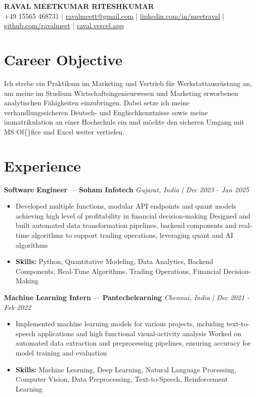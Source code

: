 \documentclass[a4paper,10pt]{article}
\begin{document}
\begin{center}
  {\Large\bfseries RAVAL MEETKUMAR RITESHKUMAR}\\[2pt]
  {\small +49 15565 468731 \;|\; \href{mailto:ravalmeett@gmail.com}{ravalmeett@gmail.com} \;|\; \href{https://www.linkedin.com/in/meetraval/}{linkedin.com/in/meetraval} \;|\; \href{https://github.com/ravalmeet}{github.com/ravalmeet} \;|\; \href{https://raval.vercel.app/}{raval.vercel.app}}
\end{center}
\vspace{-3pt}

\section*{Career Objective}
Ich strebe ein Praktikum im Marketing und Vertrieb für Werkstattausrüstung an, um meine im Studium Wirtschaftsingenieurwesen und Marketing erworbenen analytischen Fähigkeiten einzubringen. Dabei setze ich meine verhandlungssicheren Deutsch- und Englischkenntnisse sowie meine immatrikulation an einer Hochschule ein und möchte den sicheren Umgang mit MS Of\{\}fice und Excel weiter vertiefen.\par

\section*{Experience}
\textbf{Software Engineer} — \textbf{Soham Infotech} \hfill \textit{Gujarat, India \;|\; Dec 2023 - Jan 2025}\par
\vspace{1pt}
\begin{itemize}
  \item Developed multiple functions, modular API endpoints and quant models achieving high level of profitability in financial decision-making Designed and built automated data transformation pipelines, backend components and real-time algorithms to support trading operations, leveraging quant and AI algorithms
  \item \textbf{Skills:} Python, Quantitative Modeling, Data Analytics, Backend Components, Real-Time Algorithms, Trading Operations, Financial Decision-Making
\end{itemize}
\vspace{3pt}
\textbf{Machine Learning Intern} — \textbf{Pantechelearning} \hfill \textit{Chennai, India \;|\; Dec 2021 - Feb 2022}\par
\vspace{1pt}
\begin{itemize}
  \item Implemented machine learning models for various projects, including text-to-speech applications and high functional visual-activity analysis Worked on automated data extraction and preprocessing pipelines, ensuring accuracy for model training and evaluation
  \item \textbf{Skills:} Machine Learning, Deep Learning, Natural Language Processing, Computer Vision, Data Preprocessing, Text-to-Speech, Reinforcement Learning
\end{itemize}
\end{document}
